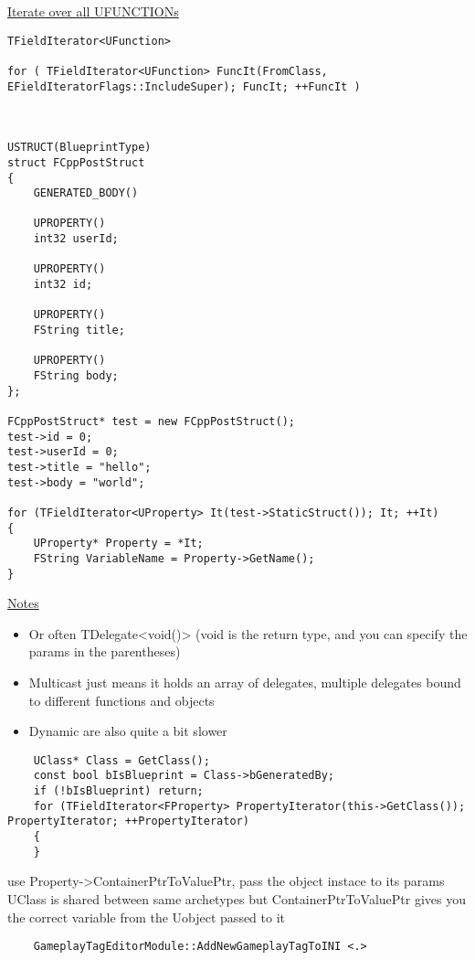     \uline{Iterate over all UFUNCTIONs}
    \begin{lstlisting}
TFieldIterator<UFunction>

for ( TFieldIterator<UFunction> FuncIt(FromClass, EFieldIteratorFlags::IncludeSuper); FuncIt; ++FuncIt )



USTRUCT(BlueprintType)
struct FCppPostStruct
{
	GENERATED_BODY()

    UPROPERTY()
	int32 userId;

    UPROPERTY()
	int32 id;

    UPROPERTY()
	FString title;
    
    UPROPERTY()
	FString body;
};

FCppPostStruct* test = new FCppPostStruct();
test->id = 0;
test->userId = 0;
test->title = "hello";
test->body = "world";

for (TFieldIterator<UProperty> It(test->StaticStruct()); It; ++It)
{
	UProperty* Property = *It;
	FString VariableName = Property->GetName();
}

    \end{lstlisting}

    \uline{Notes}
    \begin{itemize}
        \item Or often TDelegate<void()> (void is the return type, and you can specify the params in the parentheses)
        \item Multicast just means it holds an array of delegates, multiple delegates bound to different functions and objects
        \item Dynamic are also quite a bit slower
    \end{itemize}


    \begin{lstlisting}
    UClass* Class = GetClass();
    const bool bIsBlueprint = Class->bGeneratedBy;
    if (!bIsBlueprint) return;
    for (TFieldIterator<FProperty> PropertyIterator(this->GetClass()); PropertyIterator; ++PropertyIterator)
    {
    }
    \end{lstlisting}
    use Property->ContainerPtrToValuePtr, pass the object instace to its params
    UClass is shared between same archetypes
    but ContainerPtrToValuePtr gives you the correct variable from the Uobject passed to it


    \begin{lstlisting}
    GameplayTagEditorModule::AddNewGameplayTagToINI <.>
    \end{lstlisting}

